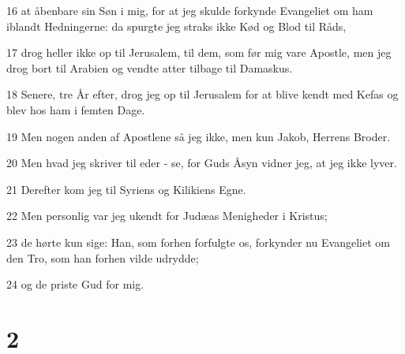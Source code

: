 \par 16 at åbenbare sin Søn i mig, for at jeg skulde forkynde Evangeliet om ham iblandt Hedningerne: da spurgte jeg straks ikke Kød og Blod til Råds,
\par 17 drog heller ikke op til Jerusalem, til dem, som før mig vare Apostle, men jeg drog bort til Arabien og vendte atter tilbage til Damaskus.
\par 18 Senere, tre År efter, drog jeg op til Jerusalem for at blive kendt med Kefas og blev hos ham i femten Dage.
\par 19 Men nogen anden af Apostlene så jeg ikke, men kun Jakob, Herrens Broder.
\par 20 Men hvad jeg skriver til eder - se, for Guds Åsyn vidner jeg, at jeg ikke lyver.
\par 21 Derefter kom jeg til Syriens og Kilikiens Egne.
\par 22 Men personlig var jeg ukendt for Judæas Menigheder i Kristus;
\par 23 de hørte kun sige: Han, som forhen forfulgte os, forkynder nu Evangeliet om den Tro, som han forhen vilde udrydde;
\par 24 og de priste Gud for mig.

\chapter{2}

